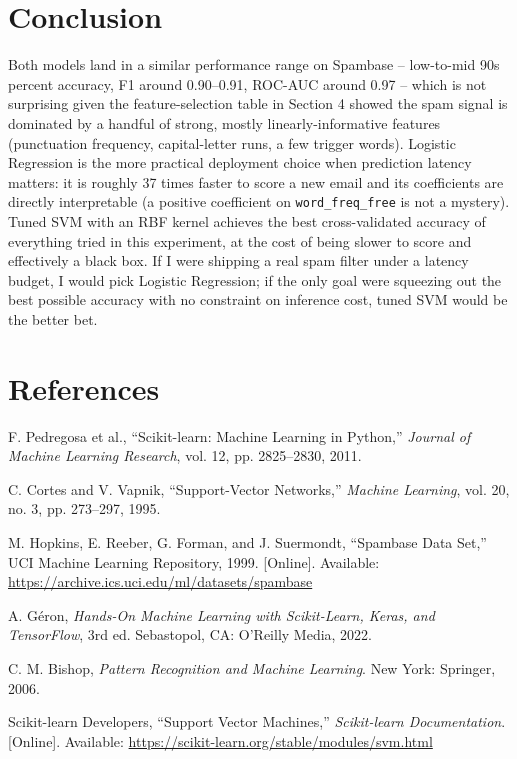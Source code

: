 \documentclass[11pt,a4paper]{article}
\begin{document}
\section{Conclusion}
Both models land in a similar performance range on Spambase -- low-to-mid 90s percent accuracy, F1 around 0.90--0.91, ROC-AUC around 0.97 -- which is not surprising given the feature-selection table in Section 4 showed the spam signal is dominated by a handful of strong, mostly linearly-informative features (punctuation frequency, capital-letter runs, a few trigger words). Logistic Regression is the more practical deployment choice when prediction latency matters: it is roughly 37 times faster to score a new email and its coefficients are directly interpretable (a positive coefficient on \texttt{word\_freq\_free} is not a mystery). Tuned SVM with an RBF kernel achieves the best cross-validated accuracy of everything tried in this experiment, at the cost of being slower to score and effectively a black box. If I were shipping a real spam filter under a latency budget, I would pick Logistic Regression; if the only goal were squeezing out the best possible accuracy with no constraint on inference cost, tuned SVM would be the better bet.

\section{References}
\begin{enumerate}[label={[\arabic*]}]
\item F. Pedregosa et al., ``Scikit-learn: Machine Learning in Python,'' \emph{Journal of Machine Learning Research}, vol. 12, pp. 2825--2830, 2011.
\item C. Cortes and V. Vapnik, ``Support-Vector Networks,'' \emph{Machine Learning}, vol. 20, no. 3, pp. 273--297, 1995.
\item M. Hopkins, E. Reeber, G. Forman, and J. Suermondt, ``Spambase Data Set,'' UCI Machine Learning Repository, 1999. [Online]. Available: \url{https://archive.ics.uci.edu/ml/datasets/spambase}
\item A. G\'eron, \emph{Hands-On Machine Learning with Scikit-Learn, Keras, and TensorFlow}, 3rd ed. Sebastopol, CA: O'Reilly Media, 2022.
\item C. M. Bishop, \emph{Pattern Recognition and Machine Learning}. New York: Springer, 2006.
\item Scikit-learn Developers, ``Support Vector Machines,'' \emph{Scikit-learn Documentation}. [Online]. Available: \url{https://scikit-learn.org/stable/modules/svm.html}
\end{enumerate}
\end{document}
